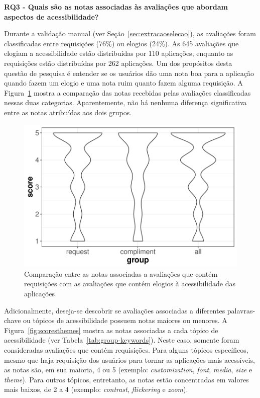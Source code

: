 \textbf{RQ3 - Quais são as notas associadas às avaliações que abordam aspectos de acessibilidade?}


Durante a validação manual (ver Seção~\ref{sec:extracaoselecao}), as avaliações foram classificadas entre requisições (76\%) ou elogios (24\%).
As 645 avaliações que elogiam a acessibilidade estão distribuídas por 110 aplicações, enquanto as requisições estão distribuídas por 262 aplicações. 
Um dos propósitos desta questão de pesquisa é entender se os usuários dão uma nota boa para a aplicação quando fazem um elogio e uma nota ruim quanto fazem alguma requisição. 
A Figura~\ref{fig:reqcompscores} mostra a comparação das notas recebidas pelas avaliações classificadas nessas duas categorias. Aparentemente, não há nenhuma diferença significativa entre as notas atribuídas aos dois grupos.

\begin{figure}[!htb]
\centering
\includegraphics[scale=0.8]{imagens/scores-compliment-request.pdf}
\caption{Comparação entre as notas associadas a avaliações que contém requisições com as avaliações que contém elogios à acessibilidade das aplicações}
\label{fig:reqcompscores}
\end{figure}

Adicionalmente, deseja-se descobrir se avaliações associadas a diferentes palavras-chave ou tópicos de acessibilidade possuem notas maiores ou menores. 
A Figura~\ref{fig:scoresthemes} mostra as notas associadas a cada tópico de acessibilidade (ver Tabela~\ref{tab:group-keywords}). 
Neste caso, somente foram consideradas avaliações que contém requisições. 
Para alguns tópicos específicos, mesmo que haja requisição dos usuários para tornar as aplicações mais acessíveis, as notas são, em sua maioria, 4 ou 5 (exemplo: \textit{customization}, \textit{font}, \textit{media}, \textit{size} e \textit{theme}).
Para outros tópicos, entretanto, as notas estão concentradas em valores mais baixos, de 2 a 4 (exemplo: \textit{contrast}, \textit{flickering} e \textit{zoom}). 


